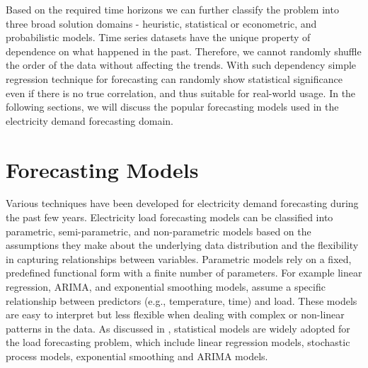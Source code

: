 \documentclass[mstat,12pt]{unswthesis}
\begin{document}
\begin{table}[h]
\caption{Forecasting methods}
\centering
{}
\label{forecasting_methods}
\end{table}

Based on the required time horizons we can further classify the problem
into three broad solution domains - heuristic, statistical or
econometric, and probabilistic models. Time series datasets have the
unique property of dependence on what happened in the past. Therefore,
we cannot randomly shuffle the order of the data without affecting the
trends. With such dependency simple regression technique for forecasting
can randomly show statistical significance even if there is no true
correlation, and thus suitable for real-world usage. In the following
sections, we will discuss the popular forecasting models used in the
electricity demand forecasting domain.

\section{Forecasting Models}\label{forecasting-models}

Various techniques have been developed for electricity demand
forecasting during the past few years. Electricity load forecasting
models can be classified into parametric, semi-parametric, and
non-parametric models based on the assumptions they make about the
underlying data distribution and the flexibility in capturing
relationships between variables. Parametric models rely on a fixed,
predefined functional form with a finite number of parameters. For
example linear regression, ARIMA, and exponential smoothing models,
assume a specific relationship between predictors (e.g., temperature,
time) and load. These models are easy to interpret but less flexible
when dealing with complex or non-linear patterns in the data. As
discussed in \cite{Fan2012}, statistical models are widely adopted for
the load forecasting problem, which include linear regression models,
stochastic process models, exponential smoothing and ARIMA models.
\end{document}
